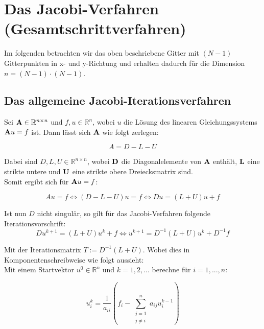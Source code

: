 \section{Das Jacobi-Verfahren (Gesamtschrittverfahren)}\label{s.Das Jacobi-Iterationsverfahren}

Im folgenden betrachten wir das oben beschriebene Gitter mit $(N-1)$ Gitterpunkten in x- und y-Richtung und erhalten dadurch für die Dimension $n = (N-1) \cdot (N-1)$. \\


\subsection{Das allgemeine Jacobi-Iterationsverfahren}\label{ss.Allgemeines Jacobi-Verfahren}

Sei ${\textbf{A}} \in \mathbb{R}^{n \times n}$ und $f,u \in \mathbb{R}^{n}$, wobei $u$ die Lösung des linearen Gleichungssystems ${\textbf{A}}u = f$ ist. Dann lässt sich ${\textbf{A}}$ wie folgt zerlegen:

\begin{equation}
A = D - L - U
\end{equation}

Dabei sind $D,L,U \in \mathbb{R}^{n \times n}$, wobei ${\textbf{D}}$ die Diagonalelemente von ${\textbf{A}}$ enthält, ${\textbf{L}}$ eine strikte untere und ${\textbf{U}}$ eine strikte obere Dreiecksmatrix sind. \\
Somit ergibt sich für ${\textbf{A}}u = f$:

\begin{equation}
Au = f \Leftrightarrow (D-L-U)u = f \Leftrightarrow Du = (L+U)u + f
\end{equation}

Ist nun $D$ nicht singulär, so gilt für das Jacobi-Verfahren folgende Iterationsvorschrift:
\begin{equation}
Du^{k+1} = (L+U)u^{k} + f \Leftrightarrow u^{k+1} = D^{-1}(L+U)u^{k} + D^{-1}f
\end{equation}

Mit der Iterationsmatrix $T := D^{-1}(L+U)$.
Wobei dies in Komponentenschreibweise wie folgt aussieht: \\
Mit einem Startvektor $u^{0} \in \mathbb{R}^{n}$ und $k=1,2,...$ berechne für $i=1,...,n$:

\begin{equation}
u^{k}_{i} = \frac {1} {a_{ii}} (f_{i} - \sum_{\substack{j = 1 \\ j \ne i}}^{n} a_{ij}u^{k-1}_{i})
\end{equation}

